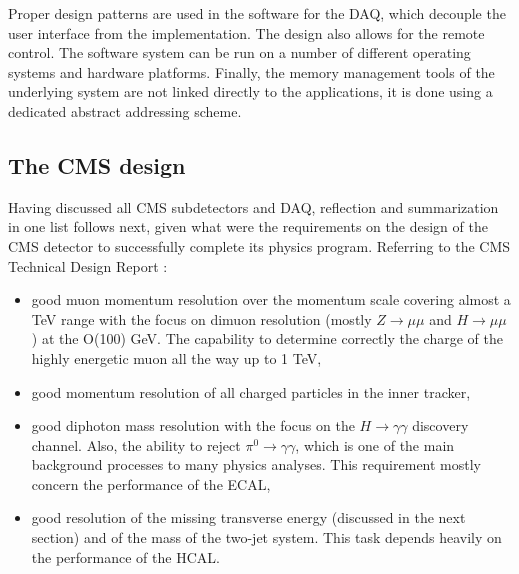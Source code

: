 \begin{normalsize}
Proper design patterns are used in the software for the DAQ, which decouple the user  interface from the implementation. The design also allows for the remote control. The  software  system  can be run on a number of different  operating  systems  and  hardware  platforms.   Finally, the memory  management  tools  of  the  underlying  system  are not linked directly to the applications, it is done using a dedicated abstract addressing  scheme.

  
\subsection{The CMS design}

Having discussed all CMS subdetectors and DAQ, reflection and summarization in one list follows next, given what were the requirements on the design of the CMS detector to successfully complete its physics program. Referring to the CMS Technical Design Report \cite{CMS_TDR}: 

\begin{itemize}
\item good muon momentum resolution over the momentum scale covering almost a TeV range with the focus on dimuon resolution (mostly $Z \rightarrow \mu \mu$ and $H \rightarrow \mu \mu$) at the O(100) GeV. The capability to determine correctly the charge of the highly energetic muon all the way up to 1 TeV,
\item good momentum resolution of all charged particles in the inner tracker,
\item good diphoton mass resolution with the focus on the $H \rightarrow \gamma \gamma$ discovery channel. Also, the ability to reject $\pi^0 \rightarrow \gamma \gamma$, which is one of the main background processes to many physics analyses.  This requirement mostly concern the performance of the ECAL,
\item good resolution of the missing transverse energy (discussed in the next section) and of the mass of the two-jet system. This task depends heavily on the performance of the HCAL.
\end{itemize}





\end{normalsize}       %
 
